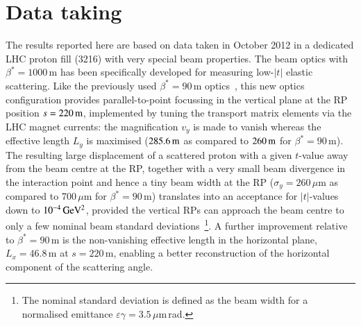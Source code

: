 \section{Data taking}
\label{sec:datataking}
%
The results reported here are based on data taken in October 2012 
in a dedicated LHC proton fill (3216)
with very special beam properties. The beam optics with $\beta^{*} = 1000\,$m
has been specifically developed for measuring low-$|t|$ elastic scattering.
Like the previously used $\beta^{*} = 90\,$m optics~\cite{epl96,epl101-tot,prl111},
this new optics configuration
provides parallel-to-point focussing in the vertical plane at the RP position 
$s = 220\,{\rm m}$, implemented by tuning the transport matrix elements via the
LHC magnet currents: the magnification $v_{y}$ is made to vanish whereas the 
effective length $L_{y}$ is maximised ($285.6\,{\rm m}$ as compared to $260\,{\rm m}$ for 
$\beta^{*} = 90\,$m).
The resulting large displacement of a scattered proton with a given $t$-value 
away from the beam centre at the RP, together with a very small beam 
divergence in the interaction point and hence a tiny beam width 
at the RP ($\sigma_{y} = 260\,\mu$m as compared to 700\,$\mu$m for 
$\beta^{*} = 90\,$m) translates into 
an acceptance for $|t|$-values down to $10^{-4}\,\rm GeV^{2}$, provided the 
vertical RPs can approach the beam centre to only a few nominal beam standard 
deviations~\footnote{The nominal standard deviation is defined as 
the beam width for a normalised emittance 
$\varepsilon \gamma = 3.5\,\mu$m\,rad.}.
A further improvement relative to $\beta^{*} = 90\,$m is the non-vanishing 
effective length in the horizontal plane, $L_{x} = 46.8\,$m at $s = 220\,$m, 
enabling a better reconstruction of the horizontal component of the 
scattering angle.

